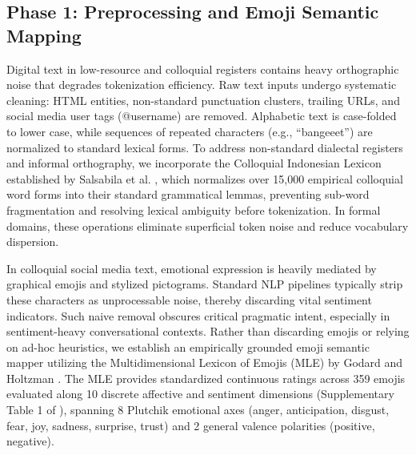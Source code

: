 \documentclass{ieeeaccess}
\begin{document}
\subsection{Phase 1: Preprocessing and Emoji Semantic Mapping}
\label{subsec:phase1}

Digital text in low-resource and colloquial registers contains heavy orthographic noise that degrades tokenization efficiency. Raw text inputs undergo systematic cleaning: HTML entities, non-standard punctuation clusters, trailing URLs, and social media user tags (@username) are removed. Alphabetic text is case-folded to lower case, while sequences of repeated characters (e.g., ``bangeeet'') are normalized to standard lexical forms. To address non-standard dialectal registers and informal orthography, we incorporate the Colloquial Indonesian Lexicon established by Salsabila et al. \cite{salsabila2018colloquial}, which normalizes over 15,000 empirical colloquial word forms into their standard grammatical lemmas, preventing sub-word fragmentation and resolving lexical ambiguity before tokenization. In formal domains, these operations eliminate superficial token noise and reduce vocabulary dispersion.

In colloquial social media text, emotional expression is heavily mediated by graphical emojis and stylized pictograms. Standard NLP pipelines typically strip these characters as unprocessable noise, thereby discarding vital sentiment indicators. Such naive removal obscures critical pragmatic intent, especially in sentiment-heavy conversational contexts. Rather than discarding emojis or relying on ad-hoc heuristics, we establish an empirically grounded emoji semantic mapper utilizing the Multidimensional Lexicon of Emojis (MLE) by Godard and Holtzman \cite{godard2022multidimensional}. The MLE provides standardized continuous ratings across 359 emojis evaluated along 10 discrete affective and sentiment dimensions (Supplementary Table 1 of \cite{godard2022multidimensional}), spanning 8 Plutchik emotional axes (anger, anticipation, disgust, fear, joy, sadness, surprise, trust) and 2 general valence polarities (positive, negative). 
\end{document}
